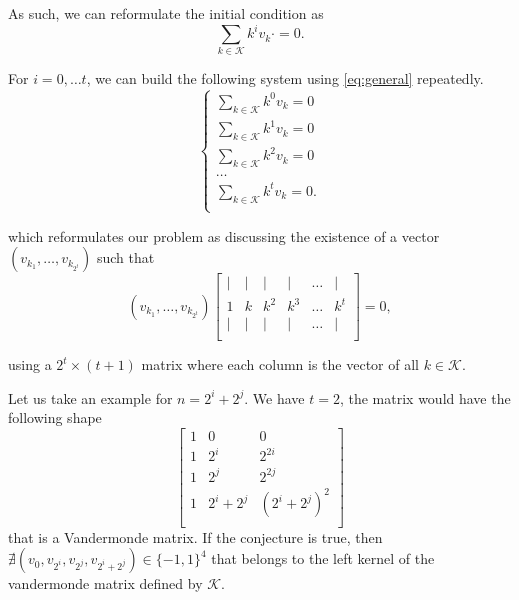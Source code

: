 As such, we can reformulate the initial condition as
\begin{equation}\label{eq:general}
    \sum_{k \in \mathcal{K}} k^iv_k \cdot = 0.
\end{equation}

For $i = 0, \ldots t$, we can build the following system using \cref{eq:general} repeatedly.
\begin{equation}
    \begin{cases}
        \sum_{k \in \mathcal{K}} k^0v_k = 0\\
        \sum_{k \in \mathcal{K}} k^1v_k = 0\\
        \sum_{k \in \mathcal{K}} k^2v_k = 0\\
        \ldots\\
        \sum_{k \in \mathcal{K}} k^tv_k = 0.\\
    \end{cases}
\end{equation}

which reformulates our problem as discussing the existence of a vector $(v_{k_1}, \ldots, v_{k_{2^t}})$ such that
$$
(v_{k_1}, \ldots, v_{k_{2^t}})
\begin{bmatrix}
    | & | & | & | & \ldots & |\\
    1 & k & k^2 & k^3 & \ldots & k^t\\
    | & | & | & | & \ldots & |\\
\end{bmatrix} = 0,
$$

using a  $2^t \times (t + 1)$ matrix where each column is the vector of all $k \in \mathcal{K}$.

Let us take an example for $n = 2^i + 2^j$. We have $t = 2$, the matrix would have the following shape
$$
\begin{bmatrix}
    1 & 0 & 0\\
    1 & 2^i & 2^{2i}\\
    1 & 2^j & 2^{2j}\\
    1 & 2^i + 2^j & (2^i + 2^j)^2\\
\end{bmatrix}
$$
that is a Vandermonde matrix. If the conjecture is true, then $\nexists (v_0, v_{2^i}, v_{2^j}, v_{2^i + 2^j}) \in \{-1, 1\}^4$ that belongs to the left kernel of the vandermonde matrix defined by $\mathcal{K}$.
